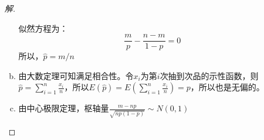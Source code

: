 \documentclass[12pt]{article}
\begin{document}
\begin{enumerate}
\begin{proof}[解]
\begin{enumerate}[(a)]
		似然方程为：
		\begin{equation}
		\frac{m}{p}-\frac{n-m}{1-p}=0
		\end{equation}
		所以，$\hat{p}=m/n$
		\item 由大数定理可知满足相合性。令$x_i$为第$i$次抽到次品的示性函数，则$\hat{p}=\sum_{i=1}^{n}\frac{x_i}{n}$，所以$E(\hat{p})=E(\sum_{i=1}^{n}\frac{x_i}{n})=p$，所以也是无偏的。
		\item 由中心极限定理，枢轴量$\frac{m-np}{\sqrt{np(1-p)}}\sim N(0,1)$
	\end{enumerate}
	
\end{proof}
\end{enumerate}
\end{document}
